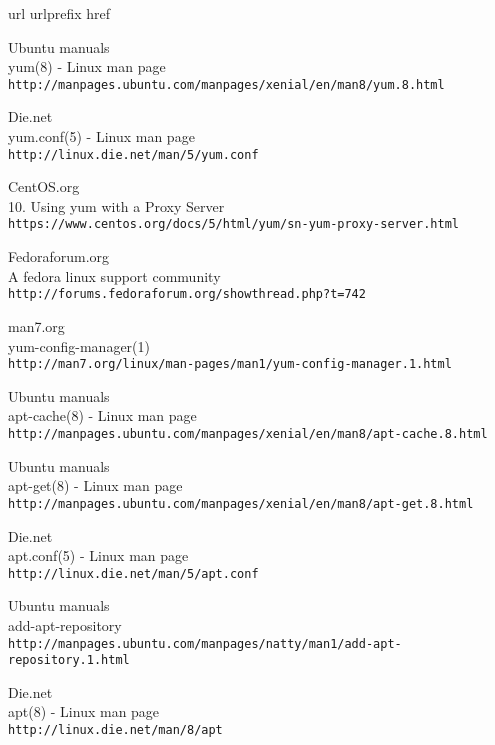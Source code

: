 \begin{thebibliography}{10}
\expandafter\ifx\csname url\endcsname\relax
  \def\url#1{\texttt{#1}}\fi
\expandafter\ifx\csname urlprefix\endcsname\relax\def\urlprefix{URL }\fi
\expandafter\ifx\csname href\endcsname\relax
  \def\href#1#2{#2} \def\path#1{#1}\fi

Ubuntu manuals\\
yum(8) - Linux man page\\
\url{http://manpages.ubuntu.com/manpages/xenial/en/man8/yum.8.html}

Die.net\\
yum.conf(5) - Linux man page\\
  \url{http://linux.die.net/man/5/yum.conf}

CentOS.org\\
10. Using yum with a Proxy Server\\
  \url{https://www.centos.org/docs/5/html/yum/sn-yum-proxy-server.html}

Fedoraforum.org\\
A fedora linux support community\\
  \url{http://forums.fedoraforum.org/showthread.php?t=742}

man7.org\\
yum-config-manager(1)\\
  \url{http://man7.org/linux/man-pages/man1/yum-config-manager.1.html}

Ubuntu manuals\\
apt-cache(8) - Linux man page\\
  \url{http://manpages.ubuntu.com/manpages/xenial/en/man8/apt-cache.8.html}

Ubuntu manuals\\
apt-get(8) - Linux man page\\
  \url{http://manpages.ubuntu.com/manpages/xenial/en/man8/apt-get.8.html}

Die.net\\
apt.conf(5) - Linux man page\\
  \url{http://linux.die.net/man/5/apt.conf}

Ubuntu manuals\\
add-apt-repository\\
  \url{http://manpages.ubuntu.com/manpages/natty/man1/add-apt-repository.1.html}

Die.net\\
apt(8) - Linux man page\\
  \url{http://linux.die.net/man/8/apt}

\end{thebibliography}

